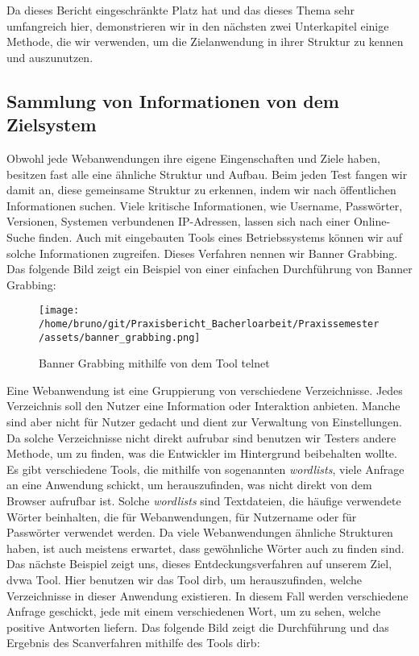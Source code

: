 Da dieses Bericht eingeschränkte Platz hat und das dieses Thema sehr umfangreich hier, demonstrieren wir in den nächsten zwei Unterkapitel einige Methode, die wir verwenden, um die Zielanwendung in ihrer Struktur zu kennen und auszunutzen.

\subsection{Sammlung von Informationen von dem Zielsystem}

Obwohl jede Webanwendungen ihre eigene Eingenschaften und Ziele haben, besitzen fast alle eine ähnliche Struktur und Aufbau. Beim jeden Test fangen wir damit an, diese gemeinsame Struktur zu erkennen, indem wir nach öffentlichen Informationen suchen. Viele kritische Informationen, wie Username, Passwörter, Versionen, Systemen verbundenen IP-Adressen, lassen sich nach einer Online-Suche finden. Auch mit eingebauten Tools eines Betriebssystems können wir auf solche Informationen zugreifen. Dieses Verfahren nennen wir Banner Grabbing. Das folgende Bild zeigt ein Beispiel von einer einfachen Durchführung von Banner Grabbing:

\begin{figure}[H]
    \centering
    \texttt{[image: /home/bruno/git/Praxisbericht\_Bacherloarbeit/Praxissemester/assets/banner\_grabbing.png]}
    \caption{Banner Grabbing mithilfe von dem Tool telnet}
    \centering
\end{figure}

Eine Webanwendung ist eine Gruppierung von verschiedene Verzeichnisse. Jedes Verzeichnis soll den Nutzer eine Information oder Interaktion anbieten. Manche sind aber nicht für Nutzer gedacht und dient zur Verwaltung von Einstellungen. Da solche Verzeichnisse nicht direkt aufrubar sind  benutzen wir Testers andere Methode, um zu finden, was die Entwickler im Hintergrund beibehalten wollte. Es gibt verschiedene Tools, die mithilfe von sogenannten \textit{wordlists}, viele Anfrage an eine Anwendung schickt, um herauszufinden, was nicht direkt von dem Browser aufrufbar ist. Solche \textit{wordlists} sind Textdateien, die häufige verwendete Wörter beinhalten, die für Webanwendungen, für Nutzername oder für Passwörter verwendet werden. Da viele Webanwendungen ähnliche Strukturen haben, ist auch meistens erwartet, dass gewöhnliche Wörter auch zu finden sind. Das nächste Beispiel zeigt uns, dieses Entdeckungsverfahren auf unserem Ziel, \gls{dvwa} Tool. Hier benutzen wir das Tool \gls{dirb}, um herauszufinden, welche Verzeichnisse in dieser Anwendung existieren. In diesem Fall werden verschiedene Anfrage geschickt, jede mit einem verschiedenen Wort, um zu sehen, welche positive Antworten liefern. Das folgende Bild zeigt die Durchführung und das Ergebnis des Scanverfahren mithilfe des Tools \gls{dirb}:

